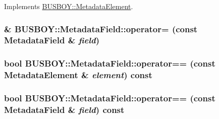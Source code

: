 Implements \hyperlink{classBUSBOY_1_1MetadataElement_a9895dfd3f251e26e8d818871405ce4c7}{BUSBOY::MetadataElement}.\hypertarget{classBUSBOY_1_1MetadataField_a752107a5e66986a12532ea606748d95a}{
\subsubsection[{operator=}]{ \& BUSBOY::MetadataField::operator= (const {\bf MetadataField} \& {\em field})}}
\label{classBUSBOY_1_1MetadataField_a752107a5e66986a12532ea606748d95a}
\hypertarget{classBUSBOY_1_1MetadataField_a0e92430d80e4ef7038f6104bd072179b}{
\subsubsection[{operator==}]{\setlength{\rightskip}{0pt plus 5cm}bool BUSBOY::MetadataField::operator== (const {\bf MetadataElement} \& {\em element}) const}}
\label{classBUSBOY_1_1MetadataField_a0e92430d80e4ef7038f6104bd072179b}
\hypertarget{classBUSBOY_1_1MetadataField_a8fc0a215619adb2f2f7eca8167211cca}{
\subsubsection[{operator==}]{\setlength{\rightskip}{0pt plus 5cm}bool BUSBOY::MetadataField::operator== (const {\bf MetadataField} \& {\em field}) const}}
\label{classBUSBOY_1_1MetadataField_a8fc0a215619adb2f2f7eca8167211cca}


